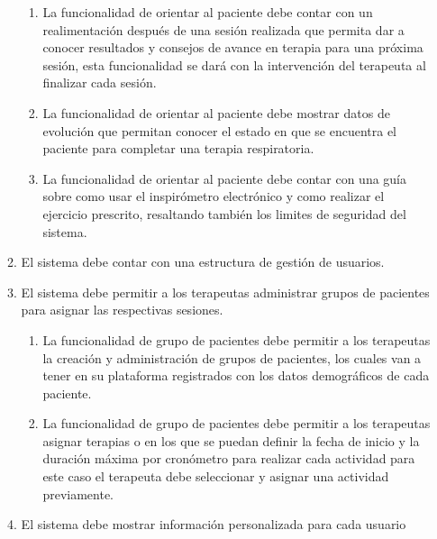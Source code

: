 \documentclass[12pt]{article}
\begin{document}
\begin{enumerate}[start=1,label={\bfseries RF0\arabic*.}]
\begin{enumerate}[label*=\arabic*.]
\begin{enumerate}[label*=\arabic*.]
                \item La funcionalidad de orientar al paciente debe contar con un realimentación después de una sesión realizada que permita dar a conocer resultados y consejos de avance en terapia para una próxima sesión, esta funcionalidad se dará con la intervención del terapeuta al finalizar cada sesión.
    
                \item La funcionalidad de orientar al paciente debe mostrar datos de evolución que permitan conocer el estado en que se encuentra el paciente para completar una terapia respiratoria.
                
                \item La funcionalidad de orientar al paciente debe contar con una guía sobre como usar el inspirómetro electrónico y como realizar el ejercicio prescrito, resaltando también los limites de seguridad del sistema.
            \end{enumerate}
            
            


 
    \item El sistema debe contar con una estructura de gestión de usuarios.
    \item El sistema debe permitir a los terapeutas  administrar grupos de pacientes para asignar las respectivas sesiones.
        \begin{enumerate}[label*=\arabic*.]
            \item La funcionalidad de grupo de pacientes debe permitir a los terapeutas la creación y administración de grupos de pacientes, los cuales van a tener en su plataforma registrados con los datos demográficos de cada paciente.
            
            \item La funcionalidad de grupo de pacientes debe permitir a los terapeutas asignar terapias o en los que se puedan definir la fecha de inicio y la duración máxima por cronómetro para realizar cada actividad para este caso el terapeuta debe seleccionar y asignar una actividad previamente.
        \end{enumerate}
        
    \item El sistema debe mostrar información personalizada para cada usuario
            

\end{enumerate}
\end{enumerate}
\end{document}
